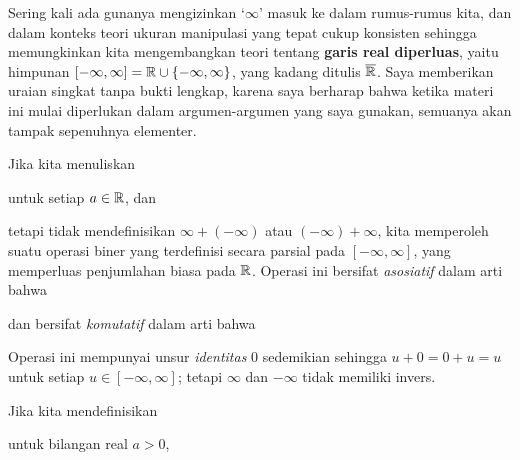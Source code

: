 
\def\chaptername{Pelengkap}
\def\sectionname{Garis real diperluas}


Sering kali ada gunanya mengizinkan
`$\infty$' masuk ke dalam rumus-rumus kita, dan dalam konteks teori ukuran
manipulasi yang tepat cukup konsisten sehingga memungkinkan kita
mengembangkan teori tentang {\bf garis real diperluas}, yaitu himpunan
$[-\infty,\infty]=\Bbb R\cup\{-\infty,\infty\}$, yang kadang ditulis
$\overline{\Bbb R}$. Saya memberikan uraian singkat tanpa bukti lengkap,
karena saya berharap bahwa ketika materi ini mulai diperlukan dalam
argumen-argumen yang saya gunakan, semuanya akan tampak sepenuhnya elementer.

 Jika kita
menuliskan


\noindent untuk setiap $a\in\Bbb R$, dan

\Centerline{$\infty+\infty=\infty$,\quad$(-\infty)+(-\infty)=-\infty$,}

\noindent tetapi tidak mendefinisikan $\infty+(-\infty)$ atau
$(-\infty)+\infty$, kita memperoleh suatu operasi biner yang terdefinisi
secara parsial pada $[-\infty,\infty]$, yang memperluas penjumlahan biasa
pada $\Bbb R$. Operasi ini bersifat {\it asosiatif} dalam arti bahwa


\noindent dan bersifat {\it komutatif} dalam arti bahwa


\noindent Operasi ini mempunyai unsur {\it identitas} $0$ sedemikian
sehingga $u+0=0+u=u$ untuk setiap $u\in[-\infty,\infty]$; tetapi $\infty$
dan $-\infty$ tidak memiliki invers.

 Jika kita mendefinisikan


\noindent untuk bilangan real $a>0$,

